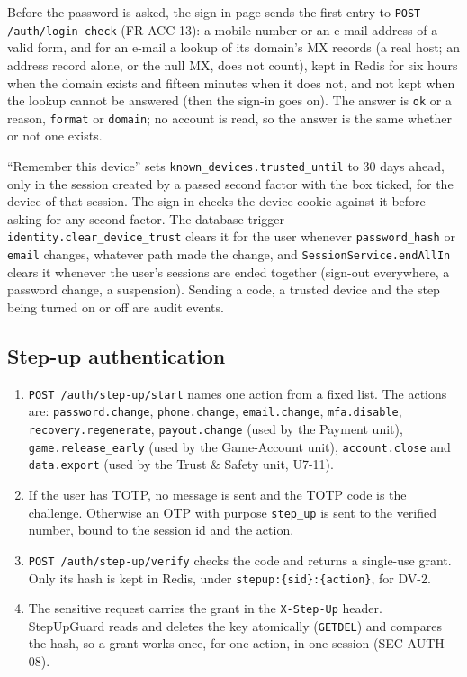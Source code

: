 \documentclass[11pt,a4paper]{article}
\begin{document}
Before the password is asked, the sign-in page sends the first entry to \texttt{POST /auth/login-check} (FR-ACC-13): a mobile number or an e-mail address of a valid form, and for an e-mail a lookup of its domain's MX records (a real host; an address record alone, or the null MX, does not count), kept in Redis for six hours when the domain exists and fifteen minutes when it does not, and not kept when the lookup cannot be answered (then the sign-in goes on). The answer is \texttt{ok} or a reason, \texttt{format} or \texttt{domain}; no account is read, so the answer is the same whether or not one exists.

``Remember this device'' sets \texttt{known\_devices.trusted\_until} to 30 days ahead, only in the session created by a passed second factor with the box ticked, for the device of that session. The sign-in checks the device cookie against it before asking for any second factor. The database trigger \texttt{identity.clear\_device\_trust} clears it for the user whenever \texttt{password\_hash} or \texttt{email} changes, whatever path made the change, and \texttt{SessionService.endAllIn} clears it whenever the user's sessions are ended together (sign-out everywhere, a password change, a suspension). Sending a code, a trusted device and the step being turned on or off are audit events.

\subsection{Step-up authentication}
\label{sec:flow-stepup}
\begin{enumerate}[nosep]
  \item \texttt{POST /auth/step-up/start} names one action from a fixed list. The actions are: \texttt{password.change}, \texttt{phone.change}, \texttt{email.change}, \texttt{mfa.disable}, \texttt{recovery.regenerate}, \texttt{payout.change} (used by the Payment unit), \texttt{game.release\_early} (used by the Game-Account unit), \texttt{account.close} and \texttt{data.export} (used by the Trust \& Safety unit, U7-11).
  \item If the user has TOTP, no message is sent and the TOTP code is the challenge. Otherwise an OTP with purpose \texttt{step\_up} is sent to the verified number, bound to the session id and the action.
  \item \texttt{POST /auth/step-up/verify} checks the code and returns a single-use grant. Only its hash is kept in Redis, under \texttt{stepup:\{sid\}:\{action\}}, for DV-2.
  \item The sensitive request carries the grant in the \texttt{X-Step-Up} header. StepUpGuard reads and deletes the key atomically (\texttt{GETDEL}) and compares the hash, so a grant works once, for one action, in one session (SEC-AUTH-08).
\end{enumerate}
\end{document}
